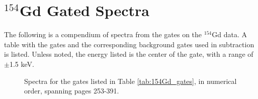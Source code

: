 
\chapter{$^{154}$Gd Gated Spectra}
\label{chap:154_spectra}

The following is a compendium of spectra from the gates on the $^{154}$Gd data. A table with the gates and the corresponding background gates used in subtraction is listed. Unless noted, the energy listed is the center of the gate, with a range of $\pm$1.5 keV.



\pagebreak

\begin{figure}
    \caption{Spectra for the gates listed in Table \ref{tab:154Gd_gates}, in numerical order, spanning pages 253-391.}
    \label{fig:154_App}
\end{figure}

\pagebreak


